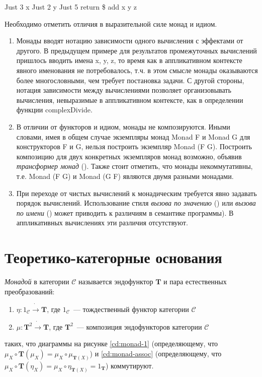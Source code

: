 \begin{haskell}
Just 3 \hsbind \lambda x \to Just 2 \hsbind \lambda y \to Just 5 \hsbind return \$ add x y z
\end{haskell}

Необходимо отметить отличия в выразительной силе монад и идиом.
\begin{enumerate}
  \item Монады вводят нотацию зависимости одного вычисления с эффектами от другого. В предыдущем примере для результатов промежуточных вычислений пришлось вводить имена \<x\>, \<y\>, \<z\>, то время как в аппликативном контексте явного именования не потребовалось, т.ч. в этом смысле монады оказываются более многословными, чем требует постановка задачи. С другой стороны, нотация зависимости между вычислениями позволяет организовывать вычисления, невыразимые в аппликативном контексте, как в определении функции \<complexDivide\>. 

  \item В отличии от функторов и идиом, монады не композируются. Иными словами, имея в общем случае экземпляры монад \<Monad F\> и \<Monad G\> для конструкторов \<F\> и \<G\>, нельзя построить экземпляр \<Monad (F \circ G)\>. Построить композицию\cite{King1993} для двух конкретных экземпляров монад возможно, объявив \emph{трансформер монад}\cite{Liang1995} (). Также стоит отметить, что монады некоммутативны, т.е. \<Monad (F \circ G)\> и \<Monad (G \circ F)\> являются двумя разными монадами.

  \item При переходе от чистых вычислений к монадическим требуется явно задавать порядок вычислений. Использование стиля \emph{вызова по значению} () или \emph{вызова по имени} () может приводить к различиям в семантике программы\cite{Petricek2012}). В аппликативных вычислениях эти различия отсутствуют.
\end{enumerate}

\section{Теоретико-категорные основания}

\begin{definition}
  \emph{Монадой} в категории $\mathcal{C}$ называется эндофунктор $\mathbf{T}$ и пара естественных преобразований:
  \begin{enumerate}
    \item $\eta : 1_{\mathcal{C}} \dot{\to} \mathbf{T}$, где $1_{\mathcal{C}}$~--- тождественный функтор категории $\mathcal{C}$
    \item $\mu : \mathbf{T}^2 \dot{\to} \mathbf{T}$, где $\mathbf{T}^2$~--- композиция эндофункторов категории $\mathcal{C}$
  \end{enumerate}
  таких, что диаграммы на рисунке \ref{cd:monad-1} (определяющему, что $\mu_X \circ \mathbf{T}(\mu_X) = \mu_X \circ \mu_{\mathbf{T}(X)}$) и \ref{cd:monad-assoc} (определяющему, что $\mu_X \circ \mathbf{T}(\eta_X) = \mu_X \circ \eta_{\mathbf{T}(X)} = 1_{\mathbf{T}}$) коммутируют.
\end{definition}

